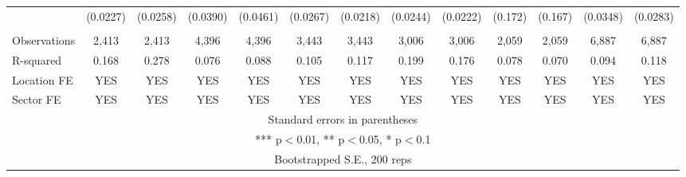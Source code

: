 \documentclass[]{article}
\begin{document}
\begin{tabular}{lcccccccccccc}
 & (0.0227) & (0.0258) & (0.0390) & (0.0461) & (0.0267) & (0.0218) & (0.0244) & (0.0222) & (0.172) & (0.167) & (0.0348) & (0.0283) \\
 &  &  &  &  &  &  &  &  &  &  &  &  \\
Observations & 2,413 & 2,413 & 4,396 & 4,396 & 3,443 & 3,443 & 3,006 & 3,006 & 2,059 & 2,059 & 6,887 & 6,887 \\
R-squared & 0.168 & 0.278 & 0.076 & 0.088 & 0.105 & 0.117 & 0.199 & 0.176 & 0.078 & 0.070 & 0.094 & 0.118 \\
Location FE & YES & YES & YES & YES & YES & YES & YES & YES & YES & YES & YES & YES \\
 Sector FE & YES & YES & YES & YES & YES & YES & YES & YES & YES & YES & YES & YES \\ \hline
\multicolumn{13}{c}{ Standard errors in parentheses} \\
\multicolumn{13}{c}{ *** p$<$0.01, ** p$<$0.05, * p$<$0.1} \\
\multicolumn{13}{c}{ Bootstrapped S.E., 200 reps} \\
\end{tabular}
\end{document}
